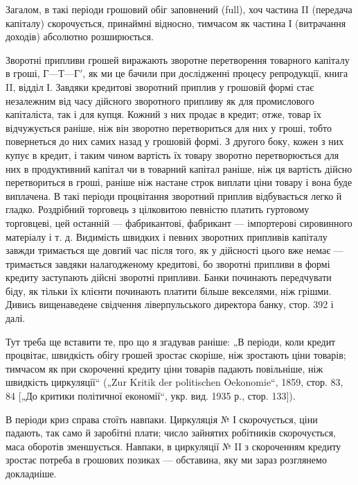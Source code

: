 Загалом, в такі періоди грошовий обіг заповнений (full),
хоч частина II (передача капіталу) скорочується, принаймні
відносно, тимчасом як частина І (витрачання доходів) абсолютно
розширюється.

Зворотні припливи грошей виражають зворотне перетворення
товарного капіталу в гроші, $Г — Т — Г'$, як ми це бачили при
дослідженні процесу репродукції, книга II, відділ І. Завдяки кредитові
зворотний приплив у грошовій формі стає незалежним
від часу дійсного зворотного припливу як для промислового капіталіста, так і для купця. Кожний з них
продає в кредит; отже,
товар їх відчужується раніше, ніж він зворотно перетвориться
для них у гроші, тобто повернеться до них самих назад у грошовій формі. З другого боку, кожен з них
купує в кредит, і таким
чином вартість їх товару зворотно перетворюється для них
в продуктивний капітал чи в товарний капітал раніше, ніж ця вартість дійсно перетвориться в гроші,
раніше ніж настане строк виплати ціни товару і вона буде виплачена. В такі періоди процвітання
зворотний приплив відбувається легко й гладко. Роздрібний
торговець з цілковитою певністю платить гуртовому торговцеві,
цей останній — фабрикантові, фабрикант — імпортерові сировинного матеріалу і т. д. Видимість швидких
і певних зворотних припливів капіталу завжди тримається ще довгий час після того, як у
дійсності цього вже немає — тримається завдяки налагодженому
кредитові, бо зворотні припливи в формі кредиту заступають
дійсні зворотні припливи. Банки починають передчувати біду,
як тільки їх клієнти починають платити більше векселями, ніж
грішми. Дивись вищенаведене свідчення ліверпульського директора банку, стор. 392 і далі.

Тут треба ще вставити те, про що я згадував раніше: „В періоди,
коли кредит процвітає, швидкість обігу грошей зростає скоріше,
ніж зростають ціни товарів; тимчасом як при скороченні кредиту ціни товарів падають повільніше, ніж
швидкість циркуляції“
(„Zur Kritik der politischen Oekonomie“, 1859, стор. 83, 84 [„До
критики політичної економії“, укр. вид. 1935 р., стор. 133]).

В періоди криз справа стоїть навпаки. Циркуляція № І скорочується, ціни падають, так само й
заробітні плати; число зайнятих робітників скорочується, маса оборотів зменшується. Навпаки, в
циркуляції № II з скороченням кредиту зростає потреба
в грошових позиках — обставина, яку ми зараз розглянемо докладніше.


